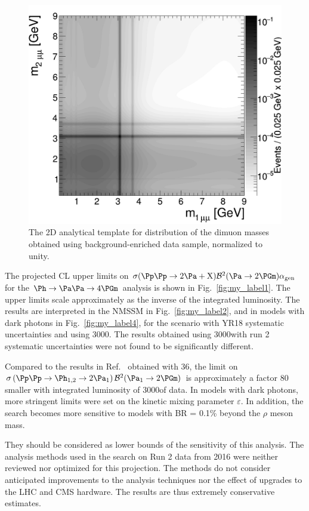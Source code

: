 \begin{figure}[tb]
\begin{center}
\includegraphics[width=0.52\linewidth]{plots/h2_background.png}
\end{center}
\caption{The 2D analytical template for distribution of the dimuon masses obtained using background-enriched data sample, normalized to unity. \label{fig:2dtemplate}}
\end{figure}

The projected CL upper limits on ${\sigma(\Pp\Pp \to 2 \Pa + \PX)  \mathcal{B}^2 (\Pa \to 2\PGm)  \alphaGen}$ for the $\Ph\to\Pa\Pa\to4\PGm$ analysis is shown in Fig.~\ref{fig:my_label1}. The upper limits scale approximately as the inverse of the integrated luminosity. The results are interpreted in the NMSSM in Fig.~\ref{fig:my_label2}, and in models with dark photons in Fig.~\ref{fig:my_label4}, for the scenario with YR18 systematic uncertainties and using 3000\fbinv. The results obtained using 3000\fbinv with run 2 systematic uncertainties were not found to be significantly different.

Compared to the results in Ref.~\cite{CMS-PAS-HIG-18-003} obtained with 36\fbinv, the limit on $\sigma \left( \Pp\Pp \to \PhOneTwo \to 2 \PaOne \right) \mathcal{B}^2(\PaOne \to 2\PGm)$ is approximately a factor 80 smaller with integrated luminosity of 3000\fbinv of data. In models with dark photons, more stringent limits were set on the kinetic mixing parameter $\varepsilon$. In addition, the search becomes more sensitive to models with BR = 0.1\% beyond the $\rho$ meson mass.

They should be considered as lower bounds of the sensitivity of this analysis. The analysis methods used in the search on Run 2 data from 2016 were neither reviewed nor optimized for this projection. The methods do not consider anticipated improvements to the analysis techniques nor the effect of upgrades to the LHC and CMS hardware. The results are thus extremely conservative estimates.


